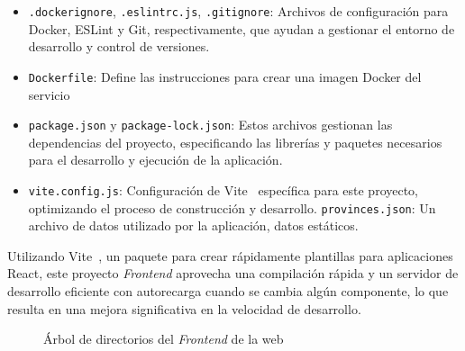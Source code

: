 \begin{itemize}
    \item \texttt{.dockerignore}, \texttt{.eslintrc.js}, \texttt{.gitignore}: Archivos de configuración para Docker, ESLint y Git, respectivamente, que ayudan a gestionar el entorno de desarrollo y control de versiones.
    \item \texttt{Dockerfile}: Define las instrucciones para crear una imagen Docker del servicio 
    \item \texttt{package.json} y \texttt{package-lock.json}: Estos archivos gestionan las dependencias del proyecto, especificando las librerías y paquetes necesarios para el desarrollo y ejecución de la aplicación.
    \item \texttt{vite.config.js}: Configuración de Vite~\cite{vite} específica para este proyecto, optimizando el proceso de construcción y desarrollo.
    \texttt{provinces.json}: Un archivo de datos utilizado por la aplicación, datos estáticos.
\end{itemize}

Utilizando Vite~\cite{vite}, un paquete para crear rápidamente plantillas para aplicaciones React, este proyecto \textit{Frontend} aprovecha una compilación rápida y un servidor de desarrollo eficiente con autorecarga cuando se cambia algún componente, lo que resulta en una mejora significativa en la velocidad de desarrollo.

\begin{figure}
    \caption{Árbol de directorios del \textit{Frontend} de la web}
    \label{fig:dirtree_frontend}
\end{figure}

